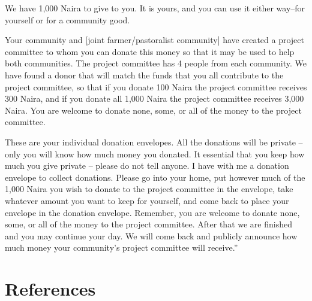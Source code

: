 \documentclass[
]{article}
\begin{document}
We have 1,000 Naira to give to you. It is yours, and you can use it
either way--for yourself or for a community good.

Your community and {[}joint farmer/pastoralist community{]} have created
a project committee to whom you can donate this money so that it may be
used to help both communities. The project committee has 4 people from
each community. We have found a donor that will match the funds that you
all contribute to the project committee, so that if you donate 100 Naira
the project committee receives 300 Naira, and if you donate all 1,000
Naira the project committee receives 3,000 Naira. You are welcome to
donate none, some, or all of the money to the project committee.

These are your individual donation envelopes. All the donations will be
private -- only you will know how much money you donated. It essential
that you keep how much you give private -- please do not tell anyone. I
have with me a donation envelope to collect donations. Please go into
your home, put however much of the 1,000 Naira you wish to donate to the
project committee in the envelope, take whatever amount you want to keep
for yourself, and come back to place your envelope in the donation
envelope. Remember, you are welcome to donate none, some, or all of the
money to the project committee. After that we are finished and you may
continue your day. We will come back and publicly announce how much
money your community's project committee will receive.''

\hypertarget{references}{%
\section*{References}\label{references}}
\end{document}
